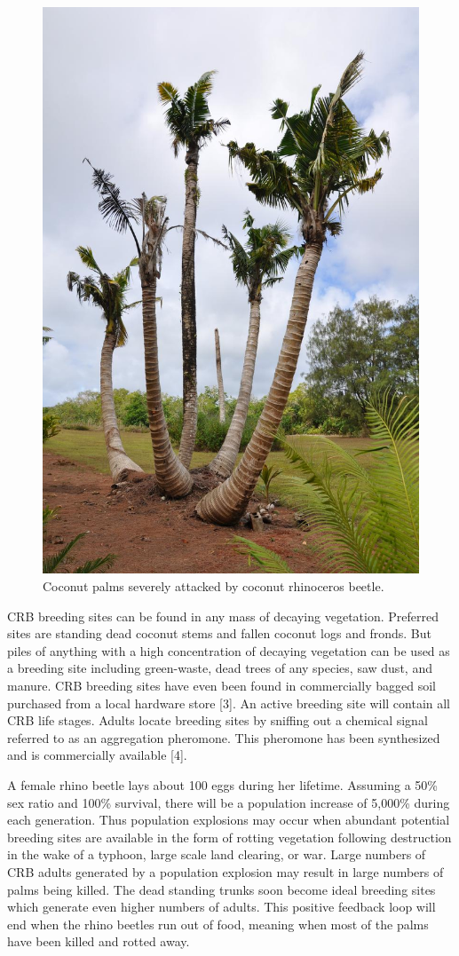 \documentclass[twocolumn,letterpaper]{scrartcl}
\begin{document}
\begin{figure}
	\centering
	\includegraphics[width=.8\linewidth]{images/dying_coconuts}
	\caption{Coconut palms severely attacked by coconut rhinoceros beetle.}
	\label{fig:dyingcoconuts}
\end{figure}


CRB breeding sites can be found in any mass of decaying vegetation. Preferred sites are standing dead coconut stems and fallen coconut logs and fronds. But piles of anything with a high concentration of decaying vegetation can be used as a breeding site including green-waste, dead trees of any species, saw dust, and manure. CRB breeding sites have even been found in commercially bagged soil purchased from a local hardware store [3]. An active breeding site will contain all CRB life stages. Adults locate breeding sites by sniffing out a chemical signal referred to as an aggregation pheromone. This pheromone has been synthesized and is commercially available [4].

A female rhino beetle lays about 100 eggs during her lifetime. Assuming a 50\% sex ratio and 100\% survival, there will be a population increase of 5,000\% during each generation. Thus population explosions may occur when abundant potential breeding sites are available in the form of rotting vegetation following destruction in the wake of a typhoon, large scale land clearing, or war. Large numbers of CRB adults generated by a population explosion may result in large numbers of palms being killed. The dead standing trunks soon become ideal breeding sites which generate even higher numbers of adults. This positive feedback loop will end when the rhino beetles run out of food, meaning when most of the palms have been killed and rotted away.
\end{document}
